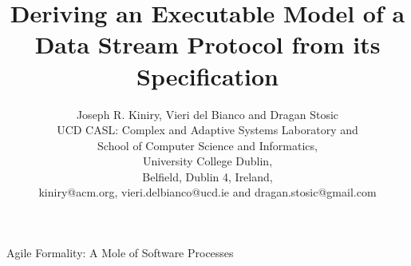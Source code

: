 \documentclass{article} \usepackage{times}
\begin{document}
Agile Formality: A Mole of Software Processes

\title{Deriving an Executable Model of a Data Stream Protocol from its
  Specification}

\author{Joseph R. Kiniry, Vieri del Bianco and Dragan Stosic\\
  UCD CASL: Complex and Adaptive Systems Laboratory and\\
  School of Computer Science and Informatics,\\
  University College Dublin,\\
  Belfield, Dublin 4, Ireland,\\
  kiniry@acm.org, vieri.delbianco@ucd.ie and dragan.stosic@gmail.com\\
}

\maketitle
\end{document}
